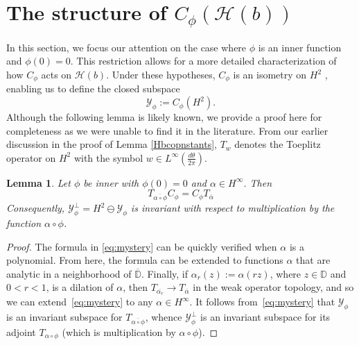 \documentclass[11pt]{amsart}
\def\D{\mathbb{D}}
\def\HH{{\mathcal H}}
\def\YY{{\mathcal Y}}
\numberwithin{equation}{section}
\theoremstyle{plain}
\newtheorem{lemma}[equation]{Lemma}
\theoremstyle{definition}
\begin{document}



\section{ The structure of $C_\phi(\HH(b))$}\label{Structure}

In this section, we focus our attention on the case where $\phi $ is an  inner function and $ \phi(0)=0 $. This restriction  allows for a more detailed characterization of how $C_\phi$ acts on $\HH(b)$. Under these hypotheses, $ C_\phi $ is an isometry on $ H^2 $  \cite{MR223914}, 
enabling us to define the closed subspace 
$$\YY_\phi := C_{\phi}(H^2).$$ 
Although the following lemma is likely known, we provide a proof here for completeness as we were unable to find it in the literature. From our earlier discussion in the proof of Lemma \ref{Hbcopnstants},  $T_{w}$ denotes the Toeplitz operator on $H^2$ with the symbol $w \in L^{\infty}(\frac{d \theta}{2 \pi})$. 

\begin{lemma}\label{le:mistery identity}
	Let $\phi$ be inner with $\phi(0)=0$ and $\alpha\in H^\infty$. Then
	\begin{equation}\label{eq:mystery}
			T_{\overline{\alpha\circ\phi}}C_\phi=C_\phi T_{\overline\alpha}
	\end{equation}
Consequently, $\YY_\phi^\perp = H^2 \ominus \mathcal{Y}_{\phi}$ is invariant with respect to multiplication by the function $\alpha\circ\phi$.
\end{lemma}

\begin{proof}
	The formula in \eqref{eq:mystery} can be quickly verified when $\alpha$ is a polynomial. From here, the formula can be extended to functions $\alpha$ that are analytic in a neighborhood of $\overline{\D}$. Finally, if $\alpha_r(z):=\alpha(rz)$, where $z \in \D$ and  $0 < r < 1$, is a dilation of $\alpha$, then $T_{\overline{\alpha_r}}\to T_{\overline\alpha} $ in the weak operator topology, and so we can extend~\eqref{eq:mystery} to any $\alpha\in H^\infty$.
	It follows from~\eqref{eq:mystery}  that $\YY_\phi$ is an invariant subspace for $T_{\overline{\alpha\circ\phi}} $, whence $\YY_\phi^\perp$ is an invariant subspace for its adjoint $T_{\alpha\circ\phi}$ (which is multiplication by $\alpha\circ\phi$).
	\end{proof}
\end{document}
